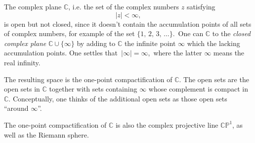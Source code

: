 \documentclass[12pt]{article}
\theoremstyle{definition}
\begin{document}
The complex plane $\mathbb{C}$, i.e. the set of the complex numbers $z$ satisfying
$$|z| < \infty,$$
is open but not closed, since it doesn't contain the accumulation points of all sets of complex numbers, for example of the set $\{1,\,2,\,3,\,\ldots\}$.\, One can  $\mathbb{C}$ to the {\em closed complex plane} $\mathbb{C}\cup\{\infty\}$ by adding to $\mathbb{C}$ the infinite point $\infty$ which  the lacking accumulation points.  One settles that\, $|\infty| = \infty$,\, where the latter $\infty$ means the real infinity.

The resulting space is the one-point compactification of $\mathbb{C}$. The open sets are the open sets in $\mathbb{C}$ together with sets containing $\infty$ whose complement is compact in $\mathbb{C}$. Conceptually, one thinks of the additional open sets as those open sets ``around $\infty$''.

The one-point compactification of $\mathbb{C}$ is also the complex projective line $\mathbb{CP}^1$, as well as the Riemann sphere.

\end{document}
